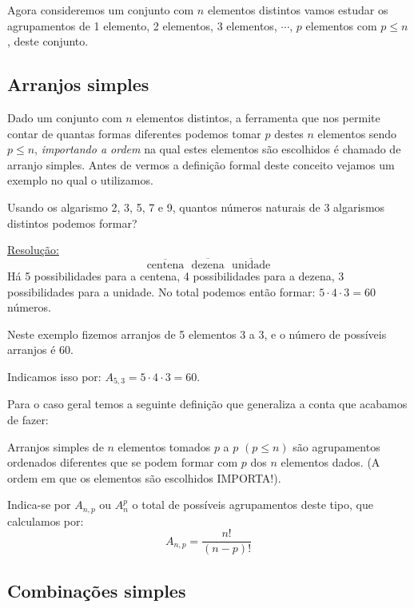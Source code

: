 Agora consideremos um conjunto com $n$ elementos distintos vamos estudar os agrupamentos de 1 elemento, 2 elementos, 3 elementos, $\cdots$, $p$ elementos com $p \leqslant n$, deste conjunto.

\subsection{Arranjos simples}

Dado um conjunto com $n$ elementos distintos, a ferramenta que nos permite contar de quantas formas diferentes podemos tomar $p$ destes $n$ elementos sendo $p \leq n$, \textit{importando a ordem} na qual estes elementos são escolhidos é chamado de arranjo simples. Antes de vermos a definição formal deste conceito vejamos um exemplo no qual o utilizamos.

\begin{exem}
 Usando os algarismo 2, 3, 5, 7 e 9, quantos números naturais de 3 algarismos distintos podemos formar?

 \underline{Resolução:}
 \[\overline{\text{centena}} \ \ \ \overline{\text{dezena}} \ \ \  \overline{\text{unidade}} \]
  Há 5 possibilidades para a centena, 4 possibilidades para a dezena, 3 possibilidades para a unidade. No total podemos então formar: $5 \cdot 4 \cdot 3= 60$ números.

  Neste exemplo fizemos arranjos de 5 elementos 3 a 3, e o número de possíveis arranjos é 60.

  Indicamos isso por: $A_{5, 3}= 5 \cdot 4 \cdot 3= 60$.
\end{exem}

Para o caso geral temos a seguinte definição que generaliza a conta que acabamos de fazer:

\vskip0.3cm
 \colorbox{azul}{
 \begin{minipage}{0.9\linewidth}
 \begin{center}
  Arranjos simples de $n$ elementos tomados $p$ a $p$ $(p \leqslant n)$ são agrupamentos ordenados diferentes que se podem formar com $p$ dos $n$ elementos dados. (A ordem em que os elementos são escolhidos IMPORTA!).

 Indica-se por $A_{n, p}$ ou $A_{n}^{p}$ o total de possíveis agrupamentos deste tipo, que calculamos por:
 \[A_{n, p}= \frac{n!}{(n-p)!}\]
 \end{center}
 \end{minipage}}
 \vskip0.3cm


\subsection{Combinações simples}

